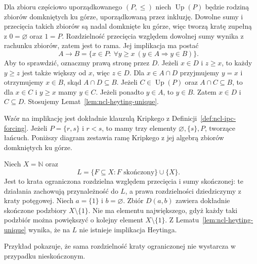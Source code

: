 \begin{przyklad}
\label{ex:ncl-heyting-upsets}
Dla zbioru częściowo uporządkowanego $(P,\leq)$
niech $\operatorname{Up}(P)$ będzie rodziną
zbiorów domkniętych ku górze, uporządkowaną przez
inkluzję. Dowolne sumy i przecięcia takich zbiorów
są nadal domknięte ku górze, więc tworzą kratę
zupełną z $0=\varnothing$ oraz $1=P$.
Rozdzielność przecięcia względem dowolnej sumy
wynika z rachunku zbiorów, zatem jest to rama.
Jej implikacja ma postać
\[
 A\to B=\{x\in P:\ \forall y\geq x\
                       (y\in A\Longrightarrow y\in B)\}.
\]
Aby to sprawdzić, oznaczmy prawą stronę przez $D$.
Jeżeli $x\in D$ i $z\geq x$, to każdy $y\geq z$
jest także większy od $x$, więc $z\in D$.
Dla $x\in A\cap D$ przyjmujemy $y=x$ i otrzymujemy
$x\in B$, skąd $A\cap D\subseteq B$.
Jeżeli $C\in\operatorname{Up}(P)$ oraz
$A\cap C\subseteq B$, to dla $x\in C$ i $y\geq x$
mamy $y\in C$. Jeżeli ponadto $y\in A$,
to $y\in B$. Zatem $x\in D$ i $C\subseteq D$.
Stosujemy Lemat~\ref{lem:ncl-heyting-unique}.
\end{przyklad}
Wzór na implikację jest dokładnie klauzulą Kripkego
z Definicji~\ref{def:ncl-ipc-forcing}.
Jeżeli $P=\{r,s\}$ i $r<s$, to mamy trzy elementy
$\varnothing,\{s\},P$, tworzące łańcuch.
Poniższy diagram zestawia ramę Kripkego z jej
algebrą zbiorów domkniętych ku górze.
\begin{center}
\end{center}

\begin{przyklad}
\label{ex:ncl-heyting-nonrelative}
Niech $X=\mathbb N$ oraz
\[
 L=\{F\subseteq X:F\text{ skończony}\}\cup\{X\}.
\]
Jest to krata ograniczona rozdzielna względem
przecięcia i sumy skończonej: te działania
zachowują przynależność do $L$, a prawa
rozdzielności dziedziczymy z kraty potęgowej.
Niech $a=\{1\}$ i $b=\varnothing$.
Zbiór $D(a,b)$ zawiera dokładnie skończone
podzbiory $X\setminus\{1\}$.
Nie ma elementu największego, gdyż każdy
taki podzbiór można powiększyć o kolejny
element $X\setminus\{1\}$.
Z Lematu~\ref{lem:ncl-heyting-unique} wynika,
że na $L$ nie istnieje implikacja Heytinga.
\end{przyklad}
Przykład pokazuje, że sama rozdzielność kraty
ograniczonej nie wystarcza w przypadku nieskończonym.

